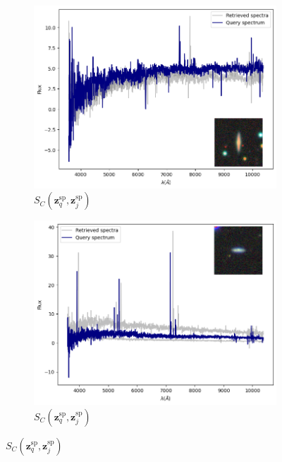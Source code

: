 \documentclass[draft, a4paper,12pt]{article}
\begin{document}
\begin{figure}[H]
    \begin{subfigure}[b]{0.45\textwidth}
        \centering
        \includegraphics[width=\textwidth]{../figures/spectral_retrieval_sp_sp_1}
        \caption{$S_C(\mathbf{z}_q^{\text{sp}}, \mathbf{z}_j^{\text{sp}})$}
        \label{fig:sp_sp_1}
    \end{subfigure}%
    \hfill
    \begin{subfigure}[b]{0.45\textwidth}
        \centering
        \includegraphics[width=\textwidth]{../figures/spectral_retrieval_sp_sp_2}
        \caption{$S_C(\mathbf{z}_q^{\text{sp}}, \mathbf{z}_j^{\text{sp}})$}
        \label{fig:sp_sp_2}
    \end{subfigure}


\end{figure}
\end{document}
